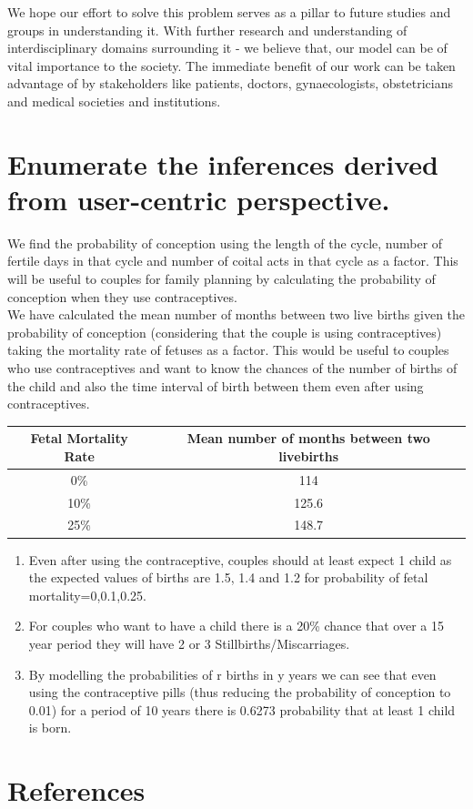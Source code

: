 \documentclass{article}
\begin{document}
We hope our effort to solve this problem serves as a pillar to future studies and groups in understanding it. With further research and understanding of interdisciplinary domains surrounding it - we believe that, our model can be of vital importance to the society. The immediate benefit of our work can be taken advantage of by stakeholders like patients, doctors, gynaecologists, obstetricians and medical societies and institutions.   

\section{Enumerate the inferences derived from user-centric perspective.}
We find the probability of conception using the length of the cycle, number of fertile days in that cycle and number of coital acts in that cycle as a factor. This will be useful to couples for family planning by calculating the probability of conception when they use contraceptives.\\

We have calculated the mean number of months between two live births given the probability of conception (considering that the couple is using contraceptives) taking the mortality rate of fetuses as a factor. This would be useful to couples who use contraceptives and want to know the chances of the number of births of the child and also the time interval of birth between them even after using contraceptives.\\
	\begin{table}[H]
		\begin{center}
			\begin{tabular}{|c|c|}
				\hline
				Fetal Mortality Rate  & Mean number of months between two livebirths\\ \hline
				0\% & 114     \\ \hline
				10\% & 125.6 \\ \hline
				25\% & 148.7 \\ \hline
			\end{tabular}
		\end{center}
	\end{table}


\begin{enumerate}
\item Even after using the contraceptive, couples should at least expect 1 child as the expected values of births are 1.5, 1.4 and 1.2 for probability of fetal mortality=0,0.1,0.25.
\item For couples who want to have a child there is a 20\% chance that over a 15 year period they will have 2 or 3 Stillbirths/Miscarriages.
\item By modelling the probabilities of r births in y years we can see that even using the contraceptive pills (thus reducing the probability of conception to 0.01) for a period of 10 years there is 0.6273 probability that at least 1 child is born.
\end{enumerate} 

\section{References}




\end{document}
